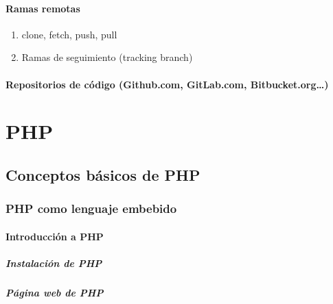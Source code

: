\documentclass[a4paper,11pt,spanish]{sphinxmanual}
\begin{document}
\subsection{Ramas remotas}
\label{\detokenize{introduccion:ramas-remotas}}\begin{enumerate}
\item {} 
clone, fetch, push, pull

\item {} 
Ramas de seguimiento (tracking branch)

\end{enumerate}


\subsection{Repositorios de código (Github.com, GitLab.com, Bitbucket.org…)}
\label{\detokenize{introduccion:repositorios-de-codigo-github-com-gitlab-com-bitbucket-org}}

\part{PHP}
\label{\detokenize{php:php}}\label{\detokenize{php::doc}}

\chapter{Conceptos básicos de PHP}
\label{\detokenize{php:conceptos-basicos-de-php}}

\section{PHP como lenguaje embebido}
\label{\detokenize{php:php-como-lenguaje-embebido}}

\subsection{Introducción a PHP}
\label{\detokenize{php:introduccion-a-php}}

\subsubsection{Instalación de PHP}
\label{\detokenize{php:instalacion-de-php}}

\subsubsection{Página web de PHP}
\label{\detokenize{php:pagina-web-de-php}}
\end{document}
